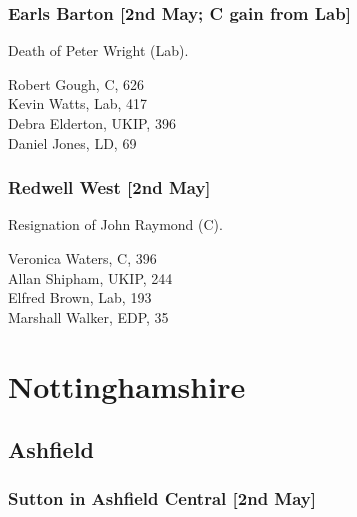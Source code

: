 \documentclass[a4paper,openany,10pt]{book}
\begin{document}
\subsubsection*{Earls Barton \hspace*{\fill}\nolinebreak[1]%
\enspace\hspace*{\fill}
[2nd May; C gain from Lab]}


Death of Peter Wright (Lab).



Robert Gough, C, 626\\
Kevin Watts, Lab, 417\\
Debra Elderton, UKIP, 396\\
Daniel Jones, LD, 69\\


\subsubsection*{Redwell West \hspace*{\fill}\nolinebreak[1]%
\enspace\hspace*{\fill}
[2nd May]}


Resignation of John Raymond (C).



Veronica Waters, C, 396\\
Allan Shipham, UKIP, 244\\
Elfred Brown, Lab, 193\\
Marshall Walker, EDP, 35\\


\vfill

\section[Nottinghamshire]{{Nottinghamshire}}

\subsection*{Ashfield}

\subsubsection*{Sutton in Ashfield Central \hspace*{\fill}\nolinebreak[1]%
\enspace\hspace*{\fill}
[2nd May]}
\end{document}
